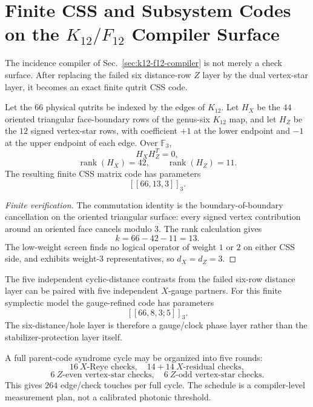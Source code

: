 
\section{Finite CSS and Subsystem Codes on the \texorpdfstring{$K_{12}/F_{12}$}{K12/F12} Compiler Surface}\label{sec:k12-f12-css-code}

The incidence compiler of Sec.~\ref{sec:k12-f12-compiler} is not merely a check surface.
After replacing the failed six distance-row $Z$ layer by the dual vertex-star layer,
it becomes an exact finite qutrit CSS code.

\begin{theorem}
Let the $66$ physical qutrits be indexed by the edges of $K_{12}$.  Let $H_X$ be the
$44$ oriented triangular face-boundary rows of the genus-six $K_{12}$ map, and let
$H_Z$ be the $12$ signed vertex-star rows, with coefficient $+1$ at the lower endpoint
and $-1$ at the upper endpoint of each edge.  Over $\mathbb F_3$,
\[
  H_X H_Z^{T}=0,
\]
\[
  \operatorname{rank}(H_X)=42,\qquad \operatorname{rank}(H_Z)=11.
\]
The resulting finite CSS matrix code has parameters
\[
  [[66,13,3]]_3.
\]
\end{theorem}

\begin{proof}[Finite verification]
The commutation identity is the boundary-of-boundary cancellation on the oriented
triangular surface: every signed vertex contribution around an oriented face cancels
modulo $3$.  The rank calculation gives
\[
  k=66-42-11=13.
\]
The low-weight screen finds no logical operator of weight $1$ or $2$ on either CSS
side, and exhibits weight-$3$ representatives, so $d_X=d_Z=3$.
\end{proof}

\begin{corollary}
The five independent cyclic-distance contrasts from the failed six-row distance layer
can be paired with five independent $X$-gauge partners.  For this finite symplectic
model the gauge-refined code has parameters
\[
  [[66,8,3;5]]_3.
\]
The six-distance/hole layer is therefore a gauge/clock phase layer rather than the
stabilizer-protection layer itself.
\end{corollary}

\begin{remark}
A full parent-code syndrome cycle may be organized into five rounds:
\[
  16\ X\text{-Reye checks},\quad 14+14\ X\text{-residual checks},
\]
\[
  6\ Z\text{-even vertex-star checks},\quad 6\ Z\text{-odd vertex-star checks}.
\]
This gives $264$ edge/check touches per full cycle.  The schedule is a compiler-level
measurement plan, not a calibrated photonic threshold.
\end{remark}

